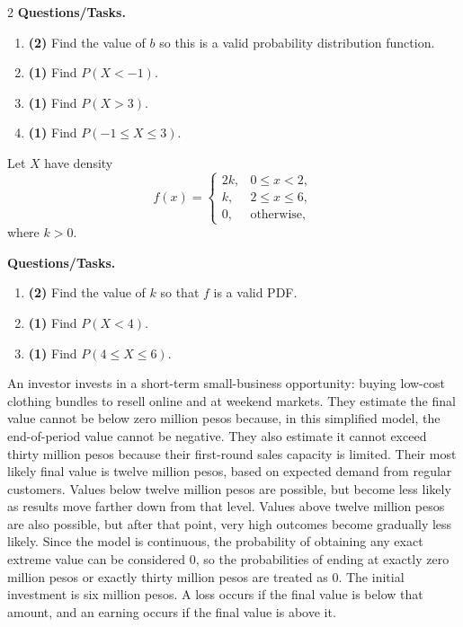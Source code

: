 \begin{multicols}{2}
		\textbf{Questions/Tasks.}
		\begin{enumerate}[label=\textbf{\alph*)}]
			\item \textbf{(2)} Find the value of $b$ so this is a valid probability distribution function.
			\item \textbf{(1)} Find $P(X<-1)$.
			\item \textbf{(1)} Find $P(X>3)$.
			\item \textbf{(1)} Find $P(-1\le X\le 3)$.
		\end{enumerate}
		
		\vspace{0.25cm}
		\vspace{-0.3cm}
		Let $X$ have density
		\[
		f(x)=
		\begin{cases}
			2k, & 0\le x<2,\\
			k, & 2\le x\le 6,\\
			0, & \text{otherwise,}
		\end{cases}
		\]
		where $k>0$.
		
		\textbf{Questions/Tasks.}
		\begin{enumerate}[label=\textbf{\alph*)}]
			\item \textbf{(2)} Find the value of $k$ so that $f$ is a valid PDF.
			\item \textbf{(1)} Find $P(X<4)$.
			\item \textbf{(1)} Find $P(4\le X\le 6)$.
		\end{enumerate}
		
		\vspace{0.25cm}
		\vspace{-0.3cm}
		An investor invests in a short-term small-business opportunity: buying low-cost clothing bundles to resell online and at weekend markets. They estimate the final value cannot be below zero million pesos because, in this simplified model, the end-of-period value cannot be negative. They also estimate it cannot exceed thirty million pesos because their first-round sales capacity is limited. Their most likely final value is twelve million pesos, based on expected demand from regular customers. Values below twelve million pesos are possible, but become less likely as results move farther down from that level. Values above twelve million pesos are also possible, but after that point, very high outcomes become gradually less likely. Since the model is continuous, the probability of obtaining any exact extreme value can be considered $0$, so the probabilities of ending at exactly zero million pesos or exactly thirty million pesos are treated as $0$. The initial investment is six million pesos. A loss occurs if the final value is below that amount, and an earning occurs if the final value is above it.
		

\end{multicols}

